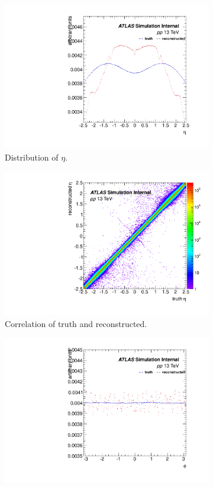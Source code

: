 \begin{figure}[H]
\begin{subfigure}{0.5\textwidth}
\includegraphics[width=1.\linewidth]{figs/sec_evtSlc/trkEff_pp13_mon_dis_eta.pdf}
\caption{Distribution of $\eta$.}
\end{subfigure}
\begin{subfigure}{0.5\textwidth}
\centering
\includegraphics[width=1.\linewidth]{figs/sec_evtSlc/trkEff_pp13_mon_crr_eta.pdf}
\caption{Correlation of truth and reconstructed.}
\end{subfigure}
\begin{subfigure}{0.5\textwidth}
\centering
\includegraphics[width=1.\linewidth]{figs/sec_evtSlc/trkEff_pp13_mon_dis_phi.pdf}

\end{subfigure}
\end{figure}
